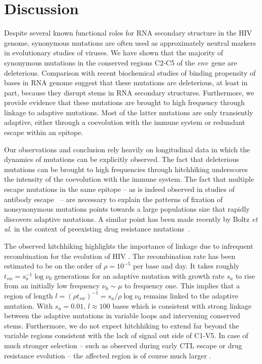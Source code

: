 \documentclass[rmp, twocolumn]{revtex4}
\newcommand{\env}{\textit{env}}
\begin{document}
\section{Discussion}
Despite several known functional roles for RNA secondary structure in the HIV
genome, synonymous mutations are often used as approximately neutral markers in
evolutionary studies of viruses. We have shown that the majority of synonymous
mutations in the conserved regions C2-C5 of the \env~gene are deleterious.
Comparison with recent biochemical studies of binding propensity of bases in RNA
genome suggest that these mutations are deleterious, at least in part, because they disrupt
stems in RNA secondary structures. Furthermore, we provide evidence that these
mutations are brought to high frequency through linkage to adaptive mutations.
Most of the latter mutations are only transiently adaptive, either through a
coevolution with the immune system or redundant escape within an epitope. 

Our observations and conclusion rely heavily on longitudinal data in which the
dynamics of mutations can be explicitly observed. The fact that deleterious
mutations can be brought to high frequencies through hitchhiking underscores
the intensity of the coevolution with the immune system. The fact that
multiple escape mutations in the same epitope -- as is indeed observed in
studies of antibody escape~\citep{moore_limited_2009, bar_early_2012} -- are
necessary to explain the patterns of fixation of nonsynonymous mutations points
towards a large populations size that rapidly discovers adaptive mutations. A
similar point has been made recently by Boltz {\it et al.} in the context of
preexisting drug resistance mutations~\citep{boltz_ultrasensitive_2012}. 

The observed hitchhiking highlights the importance of linkage due to infrequent
recombination for the evolution of HIV
\citep{neher_recombination_2010,batorsky_estimate_2011,
josefsson_majority_2011}. The recombination rate has been estimated to be on the
order of $\rho = 10^{-5}$ per base and day. It takes roughly $t_{sw} = s_a^{-1}
\log \nu_0$ generations for an adaptive mutation with growth rate $s_a$ to rise
from an initially low frequency $\nu_0\sim \mu$ to frequency one. This implies
that a region of length $l = (\rho t_{sw})^{-1} = s_a / \rho \log \nu_0$ remains
linked to the adaptive mutation. With $s_a=0.01$, $l\approx 100$ bases which is
consistent with strong linkage between the adaptive mutations in variable loops
and intervening conserved stems. Furthermore, we do not expect hitchhiking to
extend far beyond the variable regions consistent with the lack of signal out side of C1-V5. In
case of much stronger selection -- such as observed during early CTL escape or
drug resistance evolution -- the affected region is of course much larger
\citep{nijhuis_stochastic_1998}.
\end{document}
